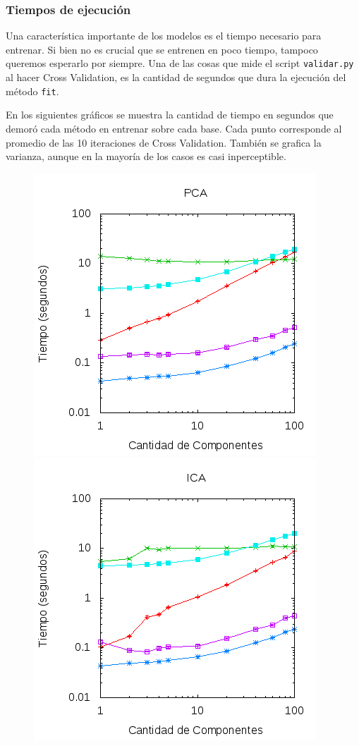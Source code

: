 \documentclass[10pt, a4paper]{article}
\begin{document}
\subsubsection{Tiempos de ejecución}

Una característica importante de los modelos es el tiempo necesario para entrenar. Si bien no es crucial que se entrenen en poco tiempo, tampoco queremos esperarlo por siempre. Una de las cosas que mide el script \texttt{validar.py} al hacer Cross Validation, es la cantidad de segundos que dura la ejecución del método \texttt{fit}.

En los siguientes gráficos se muestra la cantidad de tiempo en segundos que demoró cada método en entrenar sobre cada base. Cada punto corresponde al promedio de las 10 iteraciones de Cross Validation. También se grafica la varianza, aunque en la mayoría de los casos es casi inperceptible.

\begin{figure}[H]
\centering
\includegraphics[scale=0.6]{../src/data/tmpca.png}
\includegraphics[scale=0.6]{../src/data/tmica.png}
\end{figure}
\end{document}

